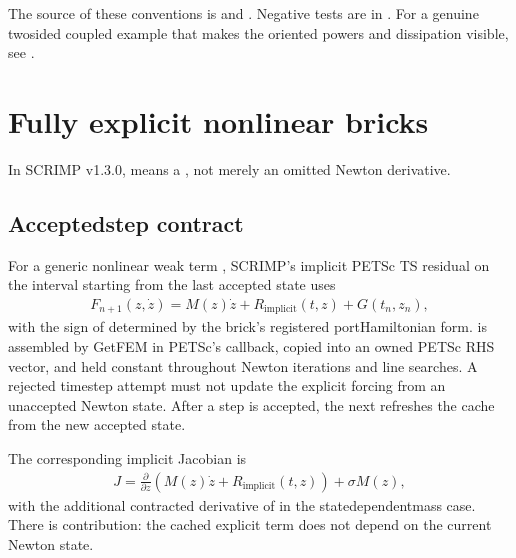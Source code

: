 \documentclass[letterpaper,10pt,english]{sphinxmanual}
\begin{document}
\sphinxAtStartPar
The source of these conventions is
 and
.
Negative tests are in
.
For a genuine two\sphinxhyphen{}sided coupled example that makes the oriented powers
and dissipation visible, see {\hyperref[\detokenize{examples/heat_wave::doc}]{}}.

\sphinxstepscope


\section{Fully explicit nonlinear bricks}
\label{\detokenize{explicit_bricks:fully-explicit-nonlinear-bricks}}\label{\detokenize{explicit_bricks::doc}}
\sphinxAtStartPar
In SCRIMP v1.3.0,  means a , not merely an omitted Newton derivative.


\subsection{Accepted\sphinxhyphen{}step contract}
\label{\detokenize{explicit_bricks:accepted-step-contract}}
\sphinxAtStartPar
For a generic nonlinear weak term , SCRIMP’s implicit
PETSc TS residual on the interval starting from the last accepted
state  uses
\begin{equation*}
\begin{split}F_{n+1}(z,\dot z) =
M(z)\dot z + R_{\mathrm{implicit}}(t,z)
+ G(t_n,z_n),\end{split}
\end{equation*}
\sphinxAtStartPar
with the sign of  determined by the brick’s registered
port\sphinxhyphen{}Hamiltonian form.  is assembled by GetFEM 
in PETSc’s  callback, copied into an owned PETSc RHS
vector, and held constant throughout Newton iterations and
line searches. A rejected time\sphinxhyphen{}step attempt must not update the
explicit forcing from an unaccepted Newton state. After a step
is accepted, the next  refreshes the cache from the
new accepted state.

\sphinxAtStartPar
The corresponding implicit Jacobian is
\begin{equation*}
\begin{split}J = \frac{\partial}{\partial z}
(M(z)\dot z + R_{\mathrm{implicit}}(t,z))
+ \sigma M(z),\end{split}
\end{equation*}
\sphinxAtStartPar
with the additional contracted derivative of  in the
state\sphinxhyphen{}dependent\sphinxhyphen{}mass case. There is 
 contribution: the cached explicit term does not
depend on the current Newton state.
\end{document}
